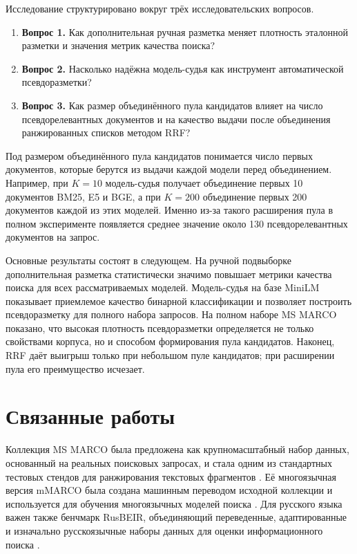 \documentclass[10pt,a4paper,twocolumn]{article}
\begin{document}
Исследование структурировано вокруг трёх исследовательских вопросов.
\begin{enumerate}[leftmargin=1.8em]
\item \textbf{Вопрос 1.} Как дополнительная ручная разметка меняет плотность эталонной разметки и значения метрик качества поиска?
\item \textbf{Вопрос 2.} Насколько надёжна модель-судья как инструмент автоматической псевдоразметки?
\item \textbf{Вопрос 3.} Как размер объединённого пула кандидатов влияет на число псевдорелевантных документов и на качество выдачи после объединения ранжированных списков методом RRF?
\end{enumerate}

Под размером объединённого пула кандидатов понимается число первых документов, которые берутся из выдачи каждой модели перед объединением. Например, при $K=10$ модель-судья получает объединение первых 10 документов BM25, E5 и BGE, а при $K=200$ \textemdash{} объединение первых 200 документов каждой из этих моделей. Именно из-за такого расширения пула в полном эксперименте появляется среднее значение около 130 псевдорелевантных документов на запрос.

Основные результаты состоят в следующем. На ручной подвыборке дополнительная разметка статистически значимо повышает метрики качества поиска для всех рассматриваемых моделей. Модель-судья на базе MiniLM показывает приемлемое качество бинарной классификации и позволяет построить псевдоразметку для полного набора запросов. На полном наборе MS MARCO показано, что высокая плотность псевдоразметки определяется не только свойствами корпуса, но и способом формирования пула кандидатов. Наконец, RRF даёт выигрыш только при небольшом пуле кандидатов; при расширении пула его преимущество исчезает.

\section{Связанные работы}

Коллекция MS MARCO была предложена как крупномасштабный набор данных, основанный на реальных поисковых запросах, и стала одним из стандартных тестовых стендов для ранжирования текстовых фрагментов \cite{bajaj2016msmarco}. Её многоязычная версия mMARCO была создана машинным переводом исходной коллекции и используется для обучения многоязычных моделей поиска \cite{bonifacio2022mmarco}. Для русского языка важен также бенчмарк RusBEIR, объединяющий переведенные, адаптированные и изначально русскоязычные наборы данных для оценки информационного поиска \cite{2025rusbeir}.
\end{document}
